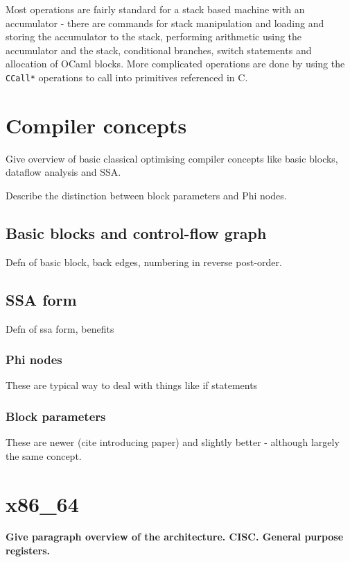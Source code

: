 Most operations are fairly standard for a stack based machine with an accumulator - there are
commands for stack manipulation and loading and storing the accumulator to the stack, performing
arithmetic using the accumulator and the stack, conditional branches, switch statements and
allocation of OCaml blocks. More complicated operations are done by using the \texttt{CCall*}
operations to call into primitives referenced in C.

\section{Compiler concepts}

Give overview of basic classical optimising compiler concepts like basic blocks, dataflow analysis
and SSA.

Describe the distinction between block parameters and Phi nodes.

\subsection{Basic blocks and control-flow graph}

Defn of basic block, back edges, numbering in reverse post-order.

\subsection{SSA form}

Defn of ssa form, benefits

\subsubsection{Phi nodes}

These are typical way to deal with things like if statements

\subsubsection{Block parameters}

These are newer (cite introducing paper) and slightly better - although largely the same concept.

\section{x86\_64}

\textbf{Give paragraph overview of the architecture. CISC. General purpose registers.}

